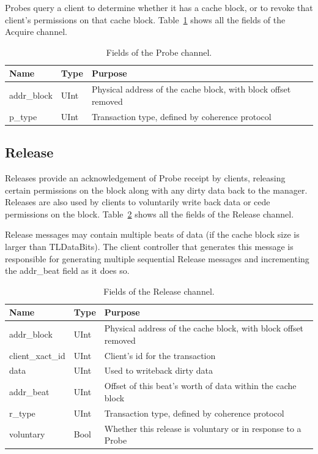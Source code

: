 Probes query a client to determine whether it has a cache block, or to revoke that client's  permissions on that cache block.
Table~\ref{tab:probe} shows all the fields of the Acquire channel.

\begin{table}[ht]
\begin{center}
\begin{tabular}{|l|l|l|}
    \hline
    Name & Type & Purpose \\ \hline \hline
addr\_block & UInt & Physical address of the cache block, with block offset removed \\ \hline
p\_type & UInt & Transaction type, defined by coherence protocol \\ \hline
\end{tabular}
\end{center}
\caption{Fields of the Probe channel.}
\label{tab:probe}
\end{table}


\subsection{Release}

Releases provide an acknowledgement of Probe receipt by clients, releasing certain permissions on the block along with any dirty data back to the manager.
Releases are also used by clients to voluntarily write back data or cede permissions on the block.
Table~\ref{tab:release} shows all the fields of the Release channel.

Release messages may contain multiple beats of data (if the cache block size is larger than TLDataBits).
The client controller that generates this message is responsible for generating multiple sequential Release messages and incrementing the addr\_beat field as it does so.

\begin{table}[ht]
\begin{center}
\begin{tabular}{|l|l|l|}
    \hline
    Name & Type & Purpose \\ \hline \hline
addr\_block & UInt & Physical address of the cache block, with block offset removed \\ \hline
client\_xact\_id & UInt & Client's id for the transaction \\ \hline
data & UInt & Used to writeback dirty data \\ \hline
addr\_beat & UInt & Offset of this beat's worth of data within the cache block \\ \hline
r\_type & UInt & Transaction type, defined by coherence protocol \\ \hline
voluntary & Bool & Whether this release is voluntary or in response to a Probe \\ \hline
\end{tabular}
\end{center}
\caption{Fields of the Release channel.}
\label{tab:release}
\end{table}

